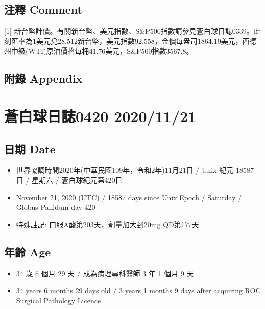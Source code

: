\documentclass[
]{article}
\providecommand{\tightlist}{%
  \setlength{\itemsep}{0pt}\setlength{\parskip}{0pt}}
\begin{document}
\hypertarget{ux6ce8ux91cb-comment-72}{%
\subsection{注釋 Comment}\label{ux6ce8ux91cb-comment-72}}

{[}1{]}
新台幣計價。有關新台幣、美元指數、S\&P500指數請參見蒼白球日誌0339。此刻匯率為1美元兌28.512新台幣，美元指數92.558，金價每盎司1864.19美元，西德州中級(WTI)原油價格每桶41.76美元，S\&P500指數3567.8。

\hypertarget{ux9644ux9304-appendix-72}{%
\subsection{附錄 Appendix}\label{ux9644ux9304-appendix-72}}

\hypertarget{ux84bcux767dux7403ux65e5ux8a8c0420-20201121}{%
\section{蒼白球日誌0420
2020/11/21}\label{ux84bcux767dux7403ux65e5ux8a8c0420-20201121}}

\hypertarget{ux65e5ux671f-date-73}{%
\subsection{日期 Date}\label{ux65e5ux671f-date-73}}

\begin{itemize}
\tightlist
\item
  世界協調時間2020年(中華民國109年，令和2年)11月21日 / Unix 紀元 18587
  日 / 星期六 / 蒼白球紀元第420日
\item
  November 21, 2020 (UTC) / 18587 days since Unix Epoch / Saturday /
  Globus Pallidum day 420
\item
  特殊註記: 口服A酸第203天，劑量加大到20mg QD第177天
\end{itemize}

\hypertarget{ux5e74ux9f61-age-73}{%
\subsection{年齡 Age}\label{ux5e74ux9f61-age-73}}

\begin{itemize}
\tightlist
\item
  34 歲 6 個月 29 天 / 成為病理專科醫師 3 年 1 個月 9 天
\item
  34 years 6 months 29 days old / 3 years 1 months 9 days after
  acquiring ROC Surgical Pathology Licence
\end{itemize}
\end{document}
